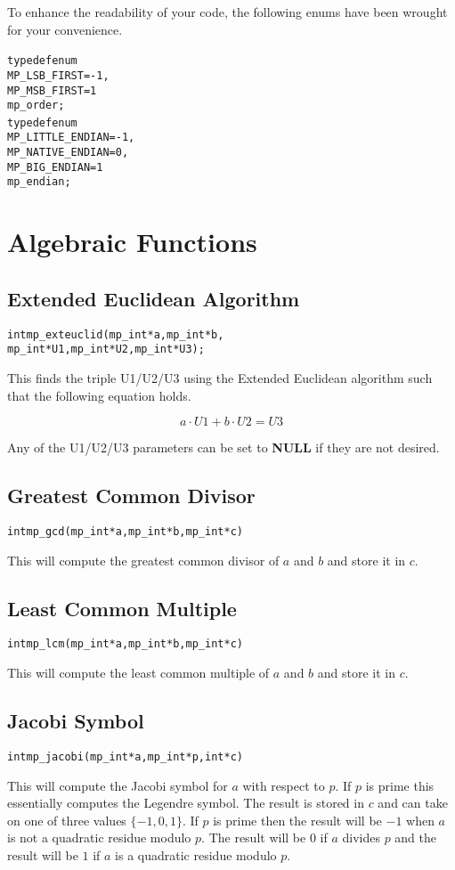 \documentclass[synpaper]{book}
\begin{document}
To enhance the readability of your code, the following enums have been wrought for your convenience.
\begin{alltt}
typedef enum {
   MP_LSB_FIRST = -1,
   MP_MSB_FIRST =  1
} mp_order;
typedef enum {
   MP_LITTLE_ENDIAN  = -1,
   MP_NATIVE_ENDIAN  =  0,
   MP_BIG_ENDIAN     =  1
} mp_endian;
\end{alltt}

\chapter{Algebraic Functions}
\section{Extended Euclidean Algorithm}
\begin{alltt}
int mp_exteuclid(mp_int *a, mp_int *b,
                 mp_int *U1, mp_int *U2, mp_int *U3);
\end{alltt}

This finds the triple U1/U2/U3 using the Extended Euclidean algorithm such that the following equation holds.

\begin{equation}
a \cdot U1 + b \cdot U2 = U3
\end{equation}

Any of the U1/U2/U3 parameters can be set to \textbf{NULL} if they are not desired.

\section{Greatest Common Divisor}
\begin{alltt}
int mp_gcd (mp_int * a, mp_int * b, mp_int * c)
\end{alltt}
This will compute the greatest common divisor of $a$ and $b$ and store it in $c$.

\section{Least Common Multiple}
\begin{alltt}
int mp_lcm (mp_int * a, mp_int * b, mp_int * c)
\end{alltt}
This will compute the least common multiple of $a$ and $b$ and store it in $c$.

\section{Jacobi Symbol}
\begin{alltt}
int mp_jacobi (mp_int * a, mp_int * p, int *c)
\end{alltt}
This will compute the Jacobi symbol for $a$ with respect to $p$.  If $p$ is prime this essentially computes the Legendre
symbol.  The result is stored in $c$ and can take on one of three values $\lbrace -1, 0, 1 \rbrace$.  If $p$ is prime
then the result will be $-1$ when $a$ is not a quadratic residue modulo $p$.  The result will be $0$ if $a$ divides $p$
and the result will be $1$ if $a$ is a quadratic residue modulo $p$.
\end{document}
